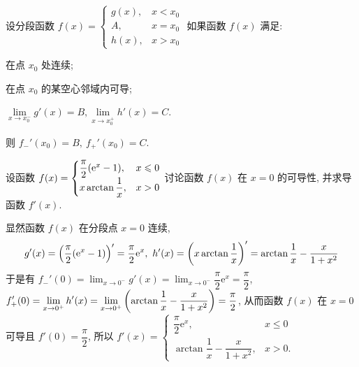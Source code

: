 \begin{theorem}
    设分段函数 $f(x)=\begin{cases}
            g(x) ,& x<x_0 \\A,&x=x_0\\h(x),&x>x_0
        \end{cases}$ 如果函数 $f(x)$ 满足:
    \begin{enumerate*}[label=(\arabic{*})]
        \item 在点 $x_0$ 处连续;
        \item 在点 $x_0$ 的某空心邻域内可导;
        \item $\lim\limits_{x\to x_0^-}g'(x)=B,\lim\limits_{x\to x_0^+}h'(x)=C$.
    \end{enumerate*}
    则 $f_{-}'(x_0)=B,~f_{+}'(x_0)=C.$
\end{theorem}

    

\begin{example}
    设函数 $f(x)=\begin{cases}
            \dfrac{\pi}{2}\qty(\mathrm{e}^x-1) ,&x\leqslant 0 \\ x\arctan\dfrac{1}{x},&x>0
        \end{cases}$
    讨论函数 $f(x)$ 在 $x=0$ 的可导性, 并求导函数 $f'(x)$.
\end{example}
\begin{solution}
    显然函数 $f(x)$ 在分段点 $x=0$ 连续, $$g'(x)=\qty(\dfrac{\pi}{2}\qty(\mathrm{e}^x-1))'=\dfrac{\pi}{2}\mathrm{e}^x,~h'(x)=\qty(x\arctan\dfrac{1}{x})'=\arctan\dfrac{1}{x}-\dfrac{x}{1+x^2}$$
    于是有 $\displaystyle f_-'(0)=\lim_{x\to0^-}g'(x)=\lim_{x\to0^-}\dfrac{\pi}{2}\mathrm{e}^x=\dfrac{\pi}{2}$, $\displaystyle f_+'(0)=\lim_{x\to0^+}h'(x)=\lim_{x\to0^+}\qty(\arctan\dfrac{1}{x}-\dfrac{x}{1+x^2})=\dfrac{\pi}{2}$, 
    从而函数 $f(x)$ 在 $x=0$ 可导且 $f'(0)=\dfrac{\pi}{2}$, 所以 $f'(x)=\begin{cases}
            \dfrac{\pi}{2}\mathrm{e}^x ,&x\leqslant 0 \\ \arctan\dfrac{1}{x}-\dfrac{x}{1+x^2},&x>0.
        \end{cases}$
\end{solution}